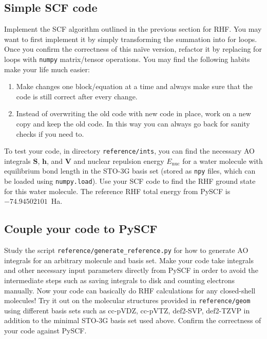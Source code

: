 \documentclass[parskip=full]{article}
\begin{document}
    \subsection{Simple SCF code}

    Implement the SCF algorithm outlined in the previous section for RHF.
    You may want to first implement it by simply transforming the summation into for loops.
    Once you confirm the correctness of this na\"ive version, refactor it by replacing for loops with \texttt{numpy} matrix/tensor operations.
    You may find the following habits make your life much easier:
    \begin{enumerate}
        \item Make changes one block/equation at a time and always make sure that the code is still correct after every change.
        \item Instead of overwriting the old code with new code in place, work on a new copy and keep the old code. In this way you can always go back for sanity checks if you need to.
    \end{enumerate}

    To test your code, in directory \texttt{reference/ints}, you can find the necessary AO integrals $\mathbf{S}$, $\mathbf{h}$, and $\mathbf{V}$ and nuclear repulsion energy $E_{\textrm{nuc}}$ for a water molecule with equilibrium bond length in the STO-3G basis set (stored as \texttt{npy} files, which can be loaded using \texttt{numpy.load}).
    Use your SCF code to find the RHF ground state for this water molecule.
    The reference RHF total energy from PySCF is $-74.94502101$~Ha.


    \subsection{Couple your code to PySCF}

    Study the script \texttt{reference/generate\_reference.py} for how to generate AO integrals for an arbitrary molecule and basis set.
    Make your code take integrals and other necessary input parameters directly from PySCF in order to avoid the intermediate steps such as saving integrals to disk and counting electrons manually.
    Now your code can basically do RHF calculations for any closed-shell molecules!
    Try it out on the molecular structures provided in \texttt{reference/geom} using different basis sets such as cc-pVDZ, cc-pVTZ, def2-SVP, def2-TZVP in addition to the minimal STO-3G basis set used above.
    Confirm the correctness of your code against PySCF.
\end{document}
